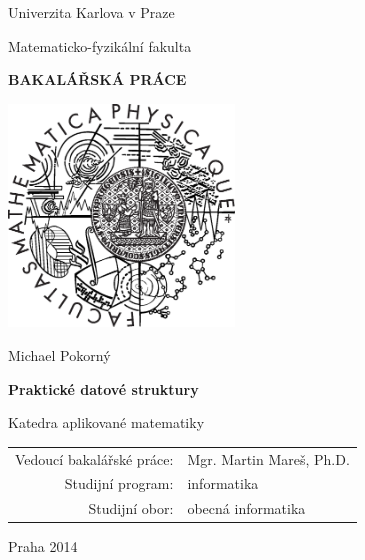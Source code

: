 \pagestyle{empty}
\begin{center}

\large

Univerzita Karlova v Praze

\medskip

Matematicko-fyzikální fakulta

\vfill

{\bf\Large BAKALÁŘSKÁ PRÁCE}

\vfill

\centerline{\mbox{\includegraphics[width=60mm]{img/logo.eps}}}

\vfill
\vspace{5mm}

{\LARGE Michael Pokorný}

\vspace{15mm}

{\LARGE\bfseries Praktické datové struktury}

\vfill

Katedra aplikované matematiky

\vfill

\begin{tabular}{rl}

Vedoucí bakalářské práce: & Mgr. Martin Mareš, Ph.D.\\
\noalign{\vspace{2mm}}
Studijní program: & informatika \\
\noalign{\vspace{2mm}}
Studijní obor: & obecná informatika \\
\end{tabular}

\vfill

Praha 2014

\end{center}
